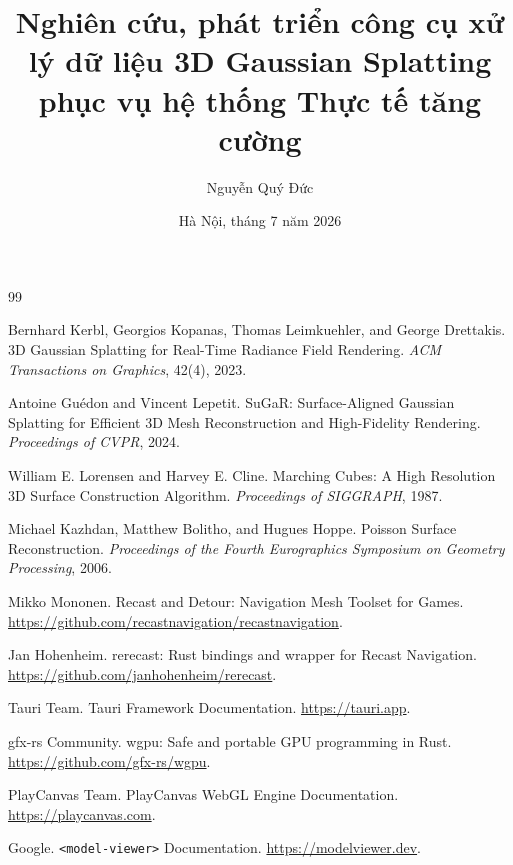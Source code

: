 \documentclass[12pt,a4paper]{article}
\title{Nghiên cứu, phát triển công cụ xử lý dữ liệu 3D Gaussian Splatting phục vụ hệ thống Thực tế tăng cường}
\author{Nguyễn Quý Đức}
\date{Hà Nội, tháng 7 năm 2026}
\begin{document}


\tableofcontents
\newpage











\newpage
\begin{thebibliography}{99}

Bernhard Kerbl, Georgios Kopanas, Thomas Leimkuehler, and George Drettakis.
\newblock 3D Gaussian Splatting for Real-Time Radiance Field Rendering.
\newblock \textit{ACM Transactions on Graphics}, 42(4), 2023.

Antoine Guédon and Vincent Lepetit.
\newblock SuGaR: Surface-Aligned Gaussian Splatting for Efficient 3D Mesh Reconstruction and High-Fidelity Rendering.
\newblock \textit{Proceedings of CVPR}, 2024.

William E. Lorensen and Harvey E. Cline.
\newblock Marching Cubes: A High Resolution 3D Surface Construction Algorithm.
\newblock \textit{Proceedings of SIGGRAPH}, 1987.

Michael Kazhdan, Matthew Bolitho, and Hugues Hoppe.
\newblock Poisson Surface Reconstruction.
\newblock \textit{Proceedings of the Fourth Eurographics Symposium on Geometry Processing}, 2006.

Mikko Mononen.
\newblock Recast and Detour: Navigation Mesh Toolset for Games.
\newblock \url{https://github.com/recastnavigation/recastnavigation}.

Jan Hohenheim.
\newblock rerecast: Rust bindings and wrapper for Recast Navigation.
\newblock \url{https://github.com/janhohenheim/rerecast}.

Tauri Team.
\newblock Tauri Framework Documentation.
\newblock \url{https://tauri.app}.

gfx-rs Community.
\newblock wgpu: Safe and portable GPU programming in Rust.
\newblock \url{https://github.com/gfx-rs/wgpu}.

PlayCanvas Team.
\newblock PlayCanvas WebGL Engine Documentation.
\newblock \url{https://playcanvas.com}.

Google.
\newblock \texttt{<model-viewer>} Documentation.
\newblock \url{https://modelviewer.dev}.

\end{thebibliography}
\end{document}
